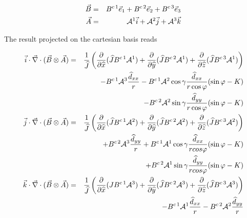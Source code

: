 \begin{eqnarray}
\vec{B} &=& B^{c \, 1}\vec{e} _{1} +
B^{c \, 2}\vec{e} _{2} +B^{c \, 3}\vec{e} _{3}\nonumber \\
\vec{A} &=& {\cal A}^{1} \vec{i} +
{\cal A}^{2}\vec{j}+{\cal A}^{3} \vec{k} \nonumber
\end{eqnarray}

The result projected on the cartesian basis reads

\begin{eqnarray}
\vec{i} \cdot \vec{\nabla}\cdot (\vec{B} \otimes \vec{A}) & = &
\dfrac{1}{\widehat{J}}\left(\dfrac{\partial}{\partial \widehat{x}}(\widehat{J}
B^{c \, 1} {\cal A}^{1})
+ \dfrac{\partial}{\partial \widehat{y}}(\widehat{J} B^{c \, 2} {\cal A}^{1})
+ \dfrac{\partial}{\partial \widehat{z}}(\widehat{J} B^{c \, 3}{\cal A}^{1})\right)
\nonumber \\
& &  -  B^{c \, 1} {\cal A}^{3}\dfrac{\widehat{d}_{xx}}{r}
 - B^{c \,1 } {\cal A}^{2} \cos \gamma \dfrac{\widehat{d}_{xx}}{r \cos\varphi}
 (\sin\varphi - K) \nonumber \\
& & -  B^{c \, 2}{\cal A}^{2} \sin \gamma \dfrac{\widehat{d}_{yy}}{r \cos\varphi}
 (\sin\varphi - K)
 \nonumber \\
\vec{j} \cdot \vec{\nabla}\cdot (\vec{B} \otimes \vec{A}) & = &
\dfrac{1}{\widehat{J}}\left(\dfrac{\partial}{\partial \widehat{x}}(\widehat{J}
B^{c \, 1} {\cal A}^{2})
+ \dfrac{\partial}{\partial \widehat{y}}(\widehat{J} B^{c \, 2}{\cal A}^{2})
 + \dfrac{\partial}{\partial \widehat{z}}(\widehat{J} B^{c\, 3}{\cal A}^{2})\right)
\nonumber \\
 & &  +  B^{c \, 2}{\cal A}^{3}\dfrac{\widehat{d}_{yy}}{r}
  +  B^{c \, 1}{\cal A}^{1} \cos \gamma \dfrac{\widehat{d}_{xx}}{r cos\varphi}
  (\sin\varphi - K) \nonumber \\
& &  +  B^{c \, 2}{\cal A}^{1} \sin \gamma \dfrac{\widehat{d}_{yy}}{r cos\varphi}
  (\sin\varphi - K)
  \nonumber \\
\vec{k} \cdot \vec{\nabla}\cdot (\vec{B} \otimes \vec{A}) & = &
\dfrac{1}{\widehat{J}}\left(\dfrac{\partial}{\partial \widehat{x}}(J B^{c \, 1}{\cal
A}^{3})
+ \dfrac{\partial}{\partial \widehat{y}}(\widehat{J} B^{c \, 2}{\cal A}^{3})
 + \dfrac{\partial}{\partial \widehat{z}}(\widehat{J} B^{c \, 3}{\cal A}^{3})\right)
 \nonumber \\
 & &  -  B^{c \, 1}{\cal A}^{1} \dfrac{\widehat{d}_{xx}}{r}
   -  B^{c \, 2}{\cal A}^{2}  \dfrac{\widehat{d}_{yy}}{r}
\end{eqnarray}


